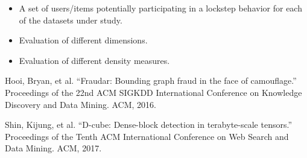 \documentclass[12pt]{article}
\begin{document}
\begin{itemize}
	
	\item A set of users/items potentially participating in a lockstep behavior for each of the datasets under study.
	\item Evaluation of different dimensions. 
	\item Evaluation of different density measures.
\end{itemize}

  
\begin{thebibliography}{99}
 

 Hooi, Bryan, et al. ``Fraudar: Bounding graph fraud in the face of camouflage.'' Proceedings of the 22nd ACM SIGKDD International Conference on Knowledge Discovery and Data Mining. ACM, 2016.

 Shin, Kijung, et al. ``D-cube: Dense-block detection in terabyte-scale tensors.'' Proceedings of the Tenth ACM International Conference on Web Search and Data Mining. ACM, 2017.

\end{thebibliography}
\end{document}
